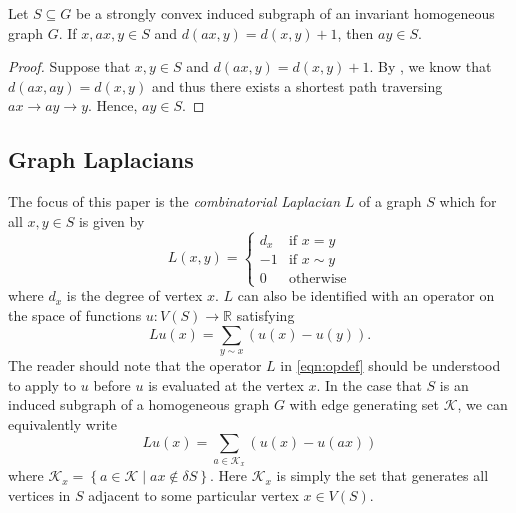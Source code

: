 \begin{lem}\label{prop:sp2}
    Let $S \subseteq G$ be a strongly convex induced subgraph of an invariant homogeneous graph $G$. If $x,ax,y \in S$ and $d(ax,y) = d(x,y) + 1$, then $ay \in S$.
\end{lem}

\begin{proof}
    Suppose that $x,y \in S$ and $d(ax,y) = d(x,y) + 1$. By , we know that $d(ax,ay)=d(x,y)$ and thus there exists a shortest path traversing $ax\rightarrow ay \rightarrow y$. Hence, $ay \in S$. 
\end{proof}

\subsection{Graph Laplacians}\label{ssec:SGT}

The focus of this paper is the \textit{combinatorial Laplacian} $L$ of a graph $S$ which for all $x,y \in S$ is given by
\begin{equation}\label{eq:Laplacian}
	L(x,y) = \begin{cases}
	d_x & \text{if $x=y$} \\
	-1 & \text{if $x\sim y$} \\
	0 & \text{otherwise}
	\end{cases}
\end{equation}
where $d_x$ is the degree of vertex $x$. $L$ can also be identified with an operator on the space of functions $u:V(S) \longrightarrow \mathbb{R}$ satisfying
\begin{equation}\label{eqn:opdef}
	Lu(x) = \sum_{y\sim x} \left( u(x) - u(y) \right).
\end{equation}
The reader should note that the operator $L$ in \cref{eqn:opdef} should be understood to apply to $u$ before $u$ is evaluated at the vertex $x$. In the case that $S$ is an induced subgraph of a homogeneous graph $G$ with edge generating set $\mathcal{K}$, we can equivalently write
\begin{equation}\label{eqn:LaplacianOp}
	Lu(x) = \sum_{a \in \mathcal{K}_x} \left(u(x)-u(ax) \right)
\end{equation}
where $\mathcal{K}_x = \left\{a \in \mathcal{K} \; \vert \; ax \notin \delta S\right\}$. Here $\mathcal{K}_x$ is simply the set that generates all vertices in $S$ adjacent to some particular vertex $x \in V(S)$. 

